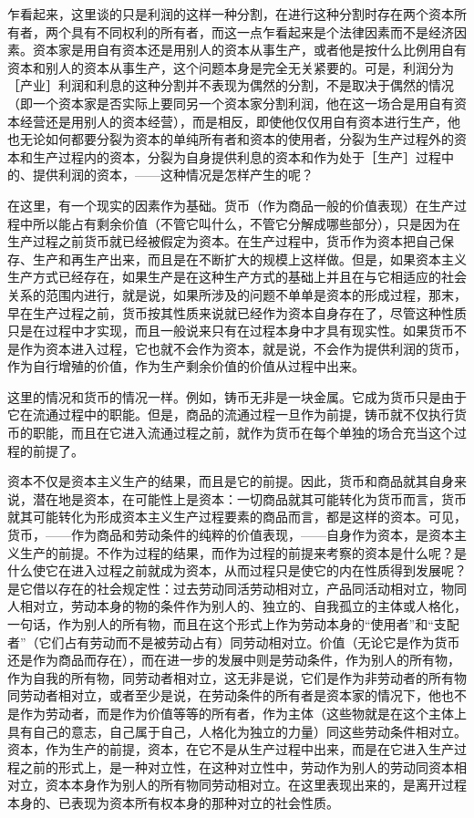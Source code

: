 乍看起来，这里谈的只是利润的这样一种分割，在进行这种分割时存在两个资本所有者，两个具有不同权利的所有者，而这一点乍看起来是个法律因素而不是经济因素。资本家是用自有资本还是用别人的资本从事生产，或者他是按什么比例用自有资本和别人的资本从事生产，这个问题本身是完全无关紧要的。可是，利润分为［产业］利润和利息的这种分割并不表现为偶然的分割，不是取决于偶然的情况（即一个资本家是否实际上要同另一个资本家分割利润，他在这一场合是用自有资本经营还是用别人的资本经营），而是相反，即使他仅仅用自有资本进行生产，他也无论如何都要分裂为资本的单纯所有者和资本的使用者，分裂为生产过程外的资本和生产过程内的资本，分裂为自身提供利息的资本和作为处于［生产］过程中的、提供利润的资本，——这种情况是怎样产生的呢？

在这里，有一个现实的因素作为基础。货币（作为商品一般的价值表现）在生产过程中所以能占有剩余价值（不管它叫什么，不管它分解成哪些部分），只是因为在生产过程之前货币就已经被假定为资本。在生产过程中，货币作为资本把自己保存、生产和再生产出来，而且是在不断扩大的规模上这样做。但是，如果资本主义生产方式已经存在，如果生产是在这种生产方式的基础上并且在与它相适应的社会关系的范围内进行，就是说，如果所涉及的问题不单单是资本的形成过程，那末，早在生产过程之前，货币按其性质来说就已经作为资本自身存在了，尽管这种性质只是在过程中才实现，而且一般说来只有在过程本身中才具有现实性。如果货币不是作为资本进入过程，它也就不会作为资本，就是说，不会作为提供利润的货币，作为自行增殖的价值，作为生产剩余价值的价值从过程中出来。

这里的情况和货币的情况一样。例如，铸币无非是一块金属。它成为货币只是由于它在流通过程中的职能。但是，商品的流通过程一旦作为前提，铸币就不仅执行货币的职能，而且在它进入流通过程之前，就作为货币在每个单独的场合充当这个过程的前提了。

资本不仅是资本主义生产的结果，而且是它的前提。因此，货币和商品就其自身来说，潜在地是资本，在可能性上是资本：一切商品就其可能转化为货币而言，货币就其可能转化为形成资本主义生产过程要素的商品而言，都是这样的资本。可见，货币，——作为商品和劳动条件的纯粹的价值表现，——自身作为资本，是资本主义生产的前提。不作为过程的结果，而作为过程的前提来考察的资本是什么呢？是什么使它在进入过程之前就成为资本，从而过程只是使它的内在性质得到发展呢？是它借以存在的社会规定性：过去劳动同活劳动相对立，产品同活动相对立，物同人相对立，劳动本身的物的条件作为别人的、独立的、自我孤立的主体或人格化，一句话，作为别人的所有物，而且在这个形式上作为劳动本身的“使用者”和“支配者”（它们占有劳动而不是被劳动占有）同劳动相对立。价值（无论它是作为货币还是作为商品而存在），而在进一步的发展中则是劳动条件，作为别人的所有物，作为自我的所有物，同劳动者相对立，这无非是说，它们是作为非劳动者的所有物同劳动者相对立，或者至少是说，在劳动条件的所有者是资本家的情况下，他也不是作为劳动者，而是作为价值等等的所有者，作为主体（这些物就是在这个主体上具有自己的意志，自己属于自己，人格化为独立的力量）同这些劳动条件相对立。资本，作为生产的前提，资本，在它不是从生产过程中出来，而是在它进入生产过程之前的形式上，是一种对立性，在这种对立性中，劳动作为别人的劳动同资本相对立，资本本身作为别人的所有物同劳动相对立。在这里表现出来的，是离开过程本身的、已表现为资本所有权本身的那种对立的社会性质。

